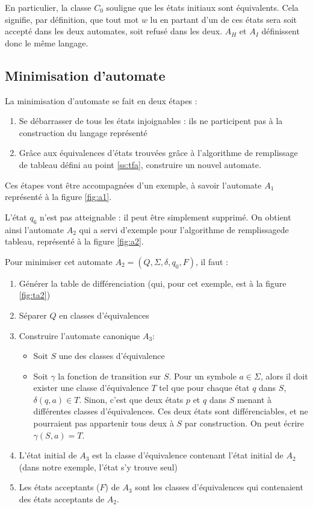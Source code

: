 	 En particulier, la classe $C_0$ souligne que les états initiaux sont équivalents. Cela signifie, par définition, que tout mot $w$ lu en partant d'un de ces états sera soit accepté dans les deux automates, soit refusé dans les deux. $A_H$ et $A_I$ définissent donc le même langage.
	 
	 
	 
	 
	 \subsection{Minimisation d'automate}\label{ss:miniauto}
	 
	 La minimisation d'automate se fait en deux étapes :
	 \begin{enumerate}
	 	\item Se débarrasser de tous les états injoignables : ils ne participent pas à la construction du langage représenté
	 	\item Grâce aux équivalences d'états trouvées grâce à l'algorithme de remplissage de tableau défini au point \ref{ss:tfa}, construire un nouvel automate. 
	 \end{enumerate}
	 
	 Ces étapes vont être accompagnées d'un exemple, à savoir l'automate $A_1$ représenté à la figure \ref{fig:a1}.
	 
	 L'état $q_6$ n'est pas atteignable : il peut être simplement supprimé. On obtient ainsi l'automate $A_2$ qui a servi d'exemple pour l'algorithme de remplissagede tableau, représenté à la figure \ref{fig:a2}.
	 
	 Pour minimiser cet automate $A_2 = (Q, \Sigma, \delta, q_0, F)$, il faut :
	 \begin{enumerate}
	 	\item Générer la table de différenciation (qui, pour cet exemple, est à la figure \ref{fig:ta2})
	 	\item Séparer $Q$ en classes d'équivalences
	 	\item Construire l'automate canonique $A_3$:
	 	\begin{itemize}
	 		\item Soit $S$ une des classes d'équivalence
	 		\item Soit $\gamma$ la fonction de transition sur $S$. Pour un symbole $a \in \Sigma$, alors il doit exister une classe d'équivalence $T$ tel que pour chaque état $q$ dans $S$, $\delta(q,a) \in T$. Sinon, c'est que deux états $p$ et $q$ dans $S$ menant à différentes classes d'équivalences. Ces deux états sont différenciables, et ne pourraient pas appartenir tous deux à $S$ par construction. On peut écrire $\gamma(S,a)=T$.
	 	\end{itemize}
	 	\item L'état initial de $A_3$ est la classe d'équivalence contenant l'état initial de $A_2$ (dans notre exemple, l'état s'y trouve seul)
	 	\item Les états acceptants ($F$) de $A_3$ sont les classes d'équivalences qui contenaient des états acceptants de $A_2$.
	 \end{enumerate}
	 
